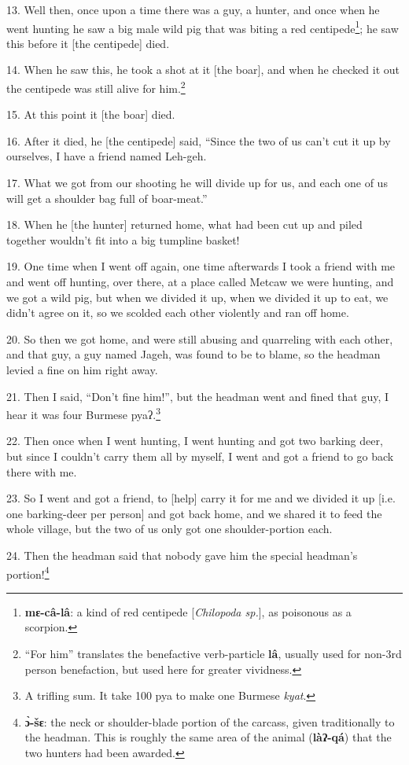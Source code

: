 13. Well then, once upon a time there was a guy, a hunter, and once when he went
hunting he saw a big male wild pig that was biting a red centipede\footnote{\textbf{mɛ-câ-lâ}: a kind of red centipede [\textit{Chilopoda sp.}], as poisonous as a scorpion.}; he saw
this before it [the centipede] died.

14. When he saw this, he took a shot at it [the boar], and when he checked it out
the centipede was still alive for him.\footnote{``For him'' translates the benefactive verb-particle \textbf{lâ}, usually used for non-3rd person benefaction, but used here for greater vividness.}

15. At this point it [the boar] died.

16. After it died, he [the centipede] said, ``Since the two of us can't cut it up
by ourselves, I have a friend named Leh-geh.

17. What we got from our shooting he will divide up for us, and each one of us will
get a shoulder bag full of boar-meat.''

18. When he [the hunter] returned home, what had been cut up and piled together
wouldn't fit into a big tumpline basket!

19. One time when I went off again, one time afterwards I took a friend with me
and went off hunting, over there, at a place called Metcaw we were hunting, and
we got a wild pig, but when we divided it up, when we divided it up to eat, we
didn't agree on it, so we scolded each other violently and ran off home.

20. So then we got home, and were still abusing and quarreling with each other,
and that guy, a guy named Jageh, was found to be to blame, so the headman levied
a fine on him right away.

21. Then I said, ``Don't fine him!'', but the headman went and fined that guy, I
hear it was four Burmese pyaʔ.\footnote{A trifling sum. It take 100 pya to make one Burmese \textit{kyat}.}

22. Then once when I went hunting, I went hunting and got two barking deer, but
since I couldn't carry them all by myself, I went and got a friend to go back there
with me.

23. So I went and got a friend, to [help] carry it for me and we divided it up [i.e.
one barking-deer per person] and got back home, and we shared it to feed the whole
village, but the two of us only got one shoulder-portion each.

24. Then the headman said that nobody gave him the special headman's portion!\footnote{\textbf{ɔ̀-šɛ}: the neck or shoulder-blade portion of the carcass, given traditionally to the headman. This is roughly the same area of the animal (\textbf{làʔ-qá}) that the two hunters had been awarded.}


